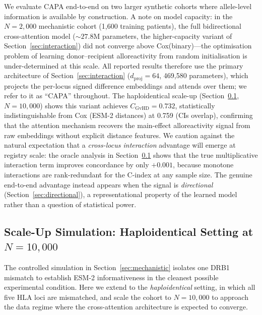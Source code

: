 \documentclass[11pt,a4paper]{article}
\begin{document}
We evaluate CAPA end-to-end on two larger synthetic cohorts where allele-level
information is available by construction.  A note on model capacity: in the
$N=2{,}000$ mechanistic cohort (1{,}600 training patients), the full
bidirectional cross-attention model (${\sim}27.8$M parameters, the
higher-capacity variant of Section~\ref{sec:interaction}) did not converge above
Cox(binary)---the optimisation problem of learning donor--recipient
alloreactivity from random initialisation is under-determined at this scale.
All reported results therefore use the primary architecture of
Section~\ref{sec:interaction} ($d_{\mathrm{proj}}=64$, 469{,}580 parameters),
which projects the per-locus signed difference embeddings and attends over
them; we refer to it as ``CAPA'' throughout.  The
haploidentical scale-up (Section~\ref{sec:haplo}, $N=10{,}000$) shows this
variant achieves $C_{\mathrm{GvHD}}=0.732$, statistically indistinguishable from
Cox (ESM-2 distances) at 0.759 (CIs overlap), confirming that the attention
mechanism recovers the main-effect alloreactivity signal from raw embeddings
without explicit distance features.  We caution against the natural expectation
that a \emph{cross-locus interaction} advantage will emerge at registry scale:
the oracle analysis in Section~\ref{sec:haplo} shows that the true multiplicative
interaction term improves concordance by only $+0.001$, because monotone
interactions are rank-redundant for the C-index at any sample size.  The genuine
end-to-end advantage instead appears when the signal is \emph{directional}
(Section~\ref{sec:directional}), a representational property of the learned
model rather than a question of statistical power.

\subsection{Scale-Up Simulation: Haploidentical Setting at $N=10{,}000$}
\label{sec:haplo}

The controlled simulation in Section~\ref{sec:mechanistic} isolates one DRB1
mismatch to establish ESM-2 informativeness in the cleanest possible experimental
condition.  Here we extend to the \emph{haploidentical} setting, in which all five
HLA loci are mismatched, and scale the cohort to $N = 10{,}000$ to approach the
data regime where the cross-attention architecture is expected to converge.
\end{document}
